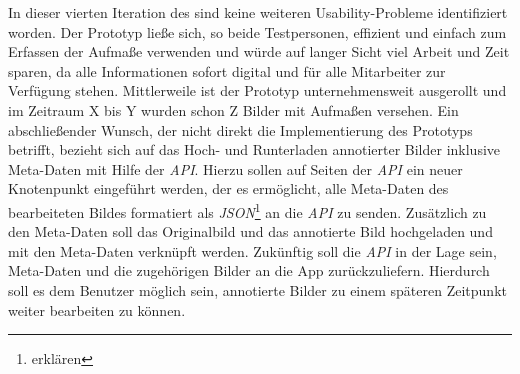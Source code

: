 In dieser vierten Iteration des \hcdp{} sind keine weiteren Usability-Probleme identifiziert worden.
Der Prototyp ließe sich, so beide Testpersonen, effizient und einfach zum Erfassen der Aufmaße verwenden und würde auf langer Sicht viel Arbeit und Zeit sparen, da alle Informationen sofort digital und für alle Mitarbeiter zur Verfügung stehen.
Mittlerweile ist der Prototyp unternehmensweit ausgerollt und im Zeitraum X bis Y wurden schon Z Bilder mit Aufmaßen versehen. 
Ein abschließender Wunsch, der nicht direkt die Implementierung des Prototyps betrifft, bezieht sich auf das Hoch- und Runterladen annotierter Bilder inklusive Meta-Daten mit Hilfe der \emph{API}.
Hierzu sollen auf Seiten der \emph{API} ein neuer Knotenpunkt eingeführt werden, der es ermöglicht, alle Meta-Daten des bearbeiteten Bildes formatiert als \emph{JSON}\footnote{erklären} an die \emph{API} zu senden.
Zusätzlich zu den Meta-Daten soll das Originalbild und das annotierte Bild hochgeladen und mit den Meta-Daten verknüpft werden.
Zukünftig soll die \emph{API} in der Lage sein, Meta-Daten und die zugehörigen Bilder an die App zurückzuliefern.
Hierdurch soll es dem Benutzer möglich sein, annotierte Bilder zu einem späteren Zeitpunkt weiter bearbeiten zu können.
